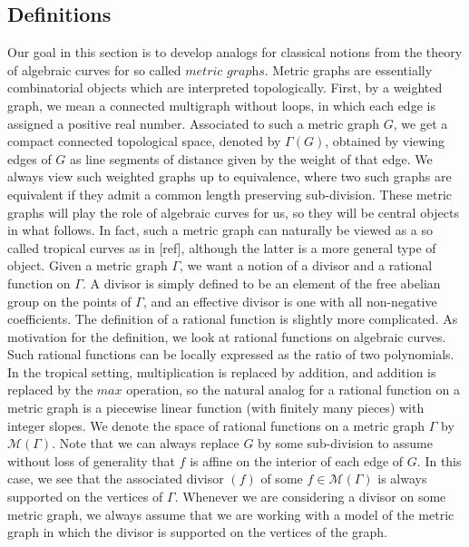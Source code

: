 \documentclass{article}
\begin{document}
\subsection{Definitions}
Our goal in this section is to develop analogs for classical notions from the theory of algebraic curves for so called $\textit{metric graphs}$. Metric graphs are essentially combinatorial objects which are interpreted topologically. First, by a weighted graph, we mean a connected multigraph without loops, in which each edge is assigned a positive real number. Associated to such a metric graph $G$, we get a compact connected topological space, denoted by $\Gamma (G)$, obtained by viewing edges of $G$ as line segments of distance given by the weight of that edge. We always view such weighted graphs up to equivalence, where two such graphs are equivalent if they admit a common length preserving sub-division. These metric graphs will play the role of algebraic curves for us, so they will be central objects in what follows. In fact, such a metric graph can naturally be viewed as a so called tropical curves as in [ref], although the latter is a more general type of object.  
\newline
\newline
Given a metric graph $\Gamma$, we want a notion of a divisor and a rational function on $\Gamma$. A divisor is simply defined to be an element of the free abelian group on the points of $\Gamma$, and an effective divisor is one with all non-negative coefficients. The definition of a rational function is slightly more complicated. As motivation for the definition, we look at rational functions on algebraic curves. Such rational functions can be locally expressed as the ratio of two polynomials. In the tropical setting, multiplication is replaced by addition, and addition is replaced by the $\textit{max}$ operation, so the natural analog for a rational function on a metric graph is a piecewise linear function (with finitely many pieces) with integer slopes. We denote the space of rational functions on a metric graph $\Gamma$ by $\mathcal{M}(\Gamma)$. Note that we can always replace $G$ by some sub-division to assume without loss of generality that $f$ is affine on the interior of each edge of $G$. In this case, we see that the associated divisor $(f)$ of some $f\in \mathcal{M}(\Gamma)$ is always supported on the vertices of $\Gamma$. Whenever we are considering a divisor on some metric graph, we always assume that we are working with a model of the metric graph in which the divisor is supported on the vertices of the graph. 
\end{document}
